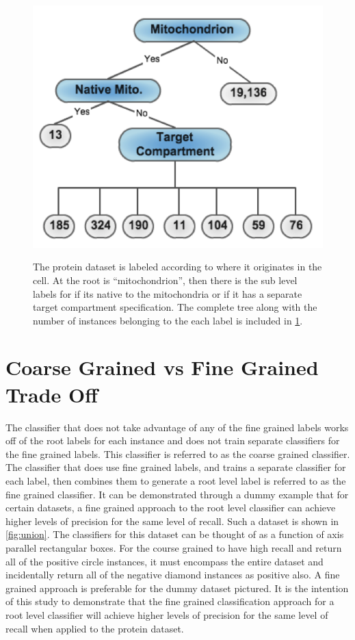 \documentclass[ms]{nuthesis}
\begin{document}
\FloatBarrier
\begin{figure}[!htb]
	\centering
    \includegraphics[width=0.5\columnwidth]{fig/Mito_tree}
    \label{fig:Mito_tree}
    \caption{The protein dataset is labeled according to where it originates in the cell. At the
    root is “mitochondrion”, then there is the sub level labels for if its native to the mitochondria
    or if it has a separate target compartment specification. The complete tree along with the number
    of instances belonging to the each label is included in \ref{fig:Mito_tree}.}
\end{figure}
\FloatBarrier

\section{Coarse Grained vs Fine Grained Trade Off}
\par The classifier that does not take advantage of any of the fine grained labels works off of the root
labels for each instance and does not train separate classifiers for the fine grained labels. This
classifier is referred to as the coarse grained classifier. The classifier that does use fine grained
labels, and trains a separate classifier for each label, then combines them to generate a root level
label is referred to as the fine grained classifier. It can be demonstrated through a dummy example
that for certain datasets, a fine grained approach to the root level classifier can achieve higher
levels of precision for the same level of recall. Such a dataset is shown in \ref{fig:union}. The
classifiers for this dataset can be thought of as a function of axis parallel rectangular boxes.
For the course grained to have high recall and return all of the positive circle instances, it must
encompass the entire dataset and incidentally return all of the negative diamond instances as
positive also. A fine grained approach is preferable for the dummy dataset pictured. It is the
intention of this study to demonstrate that the fine grained classification approach for a root
level classifier will achieve higher levels of precision for the same level of recall when
applied to the protein dataset.
\end{document}
